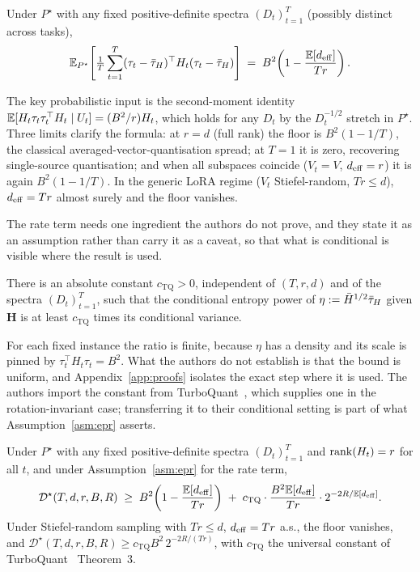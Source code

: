 \begin{lemma}\label{lem:floor-general}
Under $P^\star$ with any fixed positive-definite spectra
$(D_t)_{t=1}^T$ (possibly distinct across tasks),
\begin{equation}\label{eq:floor-closed}
  \mathbb{E}_{P^\star}\!\left[\tfrac1T\sum_{t=1}^T(\tau_t-\bar{\tau}_H)^\top
   H_t(\tau_t-\bar{\tau}_H)\right]
  \;=\; B^2\!\left(1 - \frac{\mathbb{E}[d_{\mathrm{eff}}]}{Tr}\right).
\end{equation}
\end{lemma}

The key probabilistic input is the second-moment identity
$\mathbb{E}[H_t\tau_t\tau_t^\top H_t\mid U_t] = (B^2/r) H_t$, which holds for
any $D_t$ by the $D_t^{-1/2}$ stretch in $P^\star$. Three limits
clarify the formula: at $r = d$ (full rank) the floor is
$B^2(1 - 1/T)$, the classical averaged-vector-quantisation spread; at
$T = 1$ it is zero, recovering single-source quantisation; and when
all subspaces coincide ($V_t = V$, $d_{\mathrm{eff}} = r$) it is again
$B^2(1 - 1/T)$. In the generic LoRA regime ($V_t$ Stiefel-random,
$Tr \leq d$), $d_{\mathrm{eff}} = Tr$ almost surely and the floor vanishes.

The rate term needs one ingredient the authors do not prove, and they state it as an
assumption rather than carry it as a caveat, so that what is conditional is
visible where the result is used.

\begin{assumption}\label{asm:epr}
There is an absolute constant $c_{\mathrm{TQ}} > 0$, independent of
$(T, r, d)$ and of the spectra $(D_t)_{t=1}^T$, such that the conditional
entropy power of $\eta := \bar H^{1/2}\bar{\tau}_H$ given $\boldsymbol H$ is at least
$c_{\mathrm{TQ}}$ times its conditional variance.
\end{assumption}

For each fixed instance the ratio is finite, because $\eta$ has a density and
its scale is pinned by $\tau_t^\top H_t \tau_t = B^2$. What the authors do not establish
is that the bound is uniform, and Appendix~\ref{app:proofs} isolates the exact
step where it is used. The authors import the constant from
TurboQuant~\citep{zandieh2025turboquant}, which supplies one in the
rotation-invariant case; transferring it to their conditional setting is part of
what Assumption~\ref{asm:epr} asserts.

\begin{theorem}\label{thm:general}
Under $P^\star$ with any fixed positive-definite spectra
$(D_t)_{t=1}^T$ and $\operatorname{rank}(H_t) = r$ for all $t$, and under
Assumption~\ref{asm:epr} for the rate term,
\begin{equation}\label{eq:thm-lb}
  \mathcal{D}^\star(T, d, r, B, R)
  \;\geq\;
  B^2\!\left(1 - \frac{\mathbb{E}[d_{\mathrm{eff}}]}{Tr}\right)
  \;+\; c_{\mathrm{TQ}}\cdot\frac{B^2\mathbb{E}[d_{\mathrm{eff}}]}{Tr}
  \cdot 2^{-2R/\mathbb{E}[d_{\mathrm{eff}}]}.
\end{equation}
Under Stiefel-random sampling with $Tr\leq d$, $d_{\mathrm{eff}} = Tr$ a.s., the
floor vanishes, and
$\mathcal{D}^\star(T,d,r,B,R) \geq c_{\mathrm{TQ}} B^2\,
2^{-2R/(Tr)}$, with $c_{\mathrm{TQ}}$ the universal constant of
TurboQuant~\citep{zandieh2025turboquant} Theorem~3.
\end{theorem}

